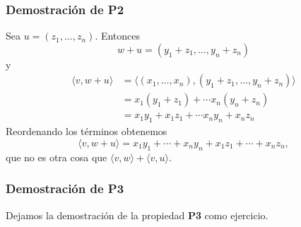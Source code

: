 \documentclass[handout]{beamer} %
\begin{document}
\begin{frame}\frametitle{Demostración de \textbf{P2}}
    
    \pause
    Sea $u = (z_1, \ldots, z_n)$. Entonces
    \begin{equation*}
    w + u = (y_1+z_1, \ldots, y_n+ z_n)
    \end{equation*}
    y
    \begin{align*}
    \langle v , w + u \rangle &= \langle (x_1, \ldots,x_n) , (y_1+z_1, \ldots, y_n+ z_n) \rangle\\
    &= x_1(y_1+z_1) + \cdots x_n(y_n+z_n) \\
    &= x_1y_1+x_1z_1 + \cdots x_ny_n+x_nz_n
    \end{align*}\pause
    Reordenando los términos obtenemos
    \begin{equation*}
    \langle v , w + u \rangle =  x_1y_1+\cdots +  x_ny_n +x_1z_1 + \cdots+x_nz_n,
    \end{equation*}
    que no es otra cosa que $\langle v , w \rangle + \langle v , u \rangle$.
\end{frame}



\begin{frame}\frametitle{Demostración de \textbf{P3}}
        \pause
        Dejamos la demostración de la propiedad \textbf{P3} como ejercicio.
\end{frame}



\end{document}
